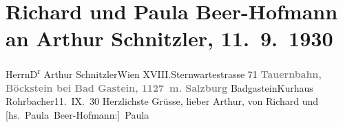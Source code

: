 

         
         \renewcommand{\erwaehntePersonen}{Personen: Richard Beer-Hofmann, Paula Beer-Hofmann}
         \renewcommand{\erwaehnteInstitutionen}{Institutionen: Tauernbahn}
         \renewcommand{\erwaehnteOrte}{Orte: Bad Gastein, Böckstein, Kurhaus Rohrbacher, Salzburg, Sternwartestraße, Wien, XVIII., Währing}
         \renewcommand{\erwaehnteWerke}{}
               \section[Richard und Paula Beer-Hofmann an Arthur Schnitzler, 11. 9. 1930]{ Richard und Paula Beer-Hofmann an Arthur Schnitzler,
               11. 9. 1930}\nopagebreak{}\rehead{ }\begin{ledgroupsized}[t]{13cm}\normalsize\beginnumbering \toendnotes[C]{\smallbreak\pagebreak[2]} 
\pstart{}{\pb}Herrn\pend{}\pstart{}D\textsuperscript{r} Arthur Schnitzler\pend{}\pstart{}Wien XVIII.\pend{}\pstart{}Sternwartestrasse 71\pend{}{\bigskip}\pstart
           \noindent{}\centering{}{\pb}\textcolor{gray}{\textbf{Tauernbahn, Böckstein bei Bad
                        Gastein, 1127 m. Salzburg}}\pend
           \pstart
           {\pb}BadgasteinKurhaus Rohrbacher11. IX. 30\pend
           \pstart Herzlichste Grüsse, lieber Arthur, von \spacefill\mbox{Richard} und \spacefill\mbox{{[}hs. Paula Beer-Hofmann:{]} Paula}\pend{}
         
         \endnumbering{}\end{ledgroupsized}  \newcommand{\dateiname}{L02539}\newcommand{\titel}{Richard und Paula Beer-Hofmann an Arthur Schnitzler, 11. 9. 1930}\newcommand{\editorInnen}{Martin Anton Müller und Gerd-Hermann Susen}
      